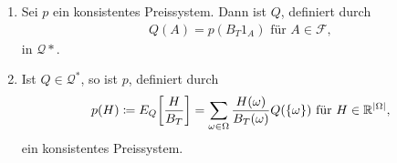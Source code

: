 \documentclass[a4paper,twoside,DIV15,BCOR12mm]{scrbook}
\newcommand{\cF}{\mathcal F}
\newcommand{\cQ}{\mathcal Q}
\begin{document}
\begin{satz}
\begin{enumerate}
\item Sei $p$ ein konsistentes Preissystem. Dann ist $Q$, definiert durch 
\begin{align*}
Q(A) = p(B_T1_A) \text{ für } A\in \cF,
\end{align*}
in $\cQ*$.
\item Ist $Q\in \cQ^*$, so ist $p$, definiert durch
\begin{align*}
p(H) \da E_Q\bigg[\frac H {B_T}\bigg] = \sum_{\omega\in\Omega} \frac{H(\omega)}{B_T(\omega)} Q(\{\omega\}) \text{ für } H\in\MdR^{|\Omega|},
\end{align*}
ein konsistentes Preissystem.
\end{enumerate}\label{satz:2.8.3}
\end{satz}
\end{document}
